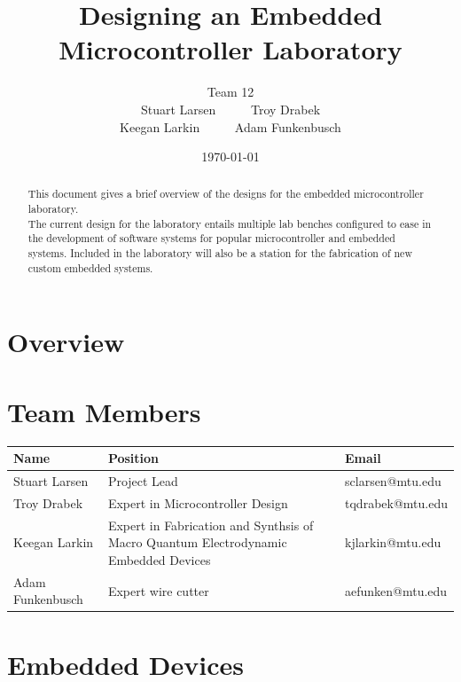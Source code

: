 \documentclass[12pt]{article}
\title{Designing an Embedded Microcontroller Laboratory}
\author{Team 12 \\ Stuart Larsen \ \ \ \ \   Troy Drabek \\ Keegan Larkin \ \ \ \ \   Adam Funkenbusch }
\date{\today}
\begin{document}
\maketitle
\thispagestyle{empty}

\pagebreak
\begin{abstract}

  This document gives a brief overview of the designs for the embedded microcontroller laboratory. \\

  \noindent
  The current design for the laboratory entails multiple lab benches configured to ease in the development of software systems for popular microcontroller and embedded systems. Included in the laboratory will also be a station for the fabrication of new custom embedded systems.

\end{abstract}

\thispagestyle{empty}
\pagebreak

\tableofcontents
\thispagestyle{empty}
\pagebreak
\setcounter{page}{1}


\section{Overview}

\section{Team Members}
\begin{center}
  \begin{tabular}{  l | p{8cm} | l }
    Name & Position & Email \\
    \hline
    Stuart Larsen & Project Lead & sclarsen@mtu.edu \\ 
    Troy Drabek & Expert in Microcontroller Design & tqdrabek@mtu.edu \\
    Keegan Larkin & Expert in Fabrication and Synthsis of Macro Quantum Electrodynamic Embedded Devices  & kjlarkin@mtu.edu \\
    Adam Funkenbusch & Expert wire cutter & aefunken@mtu.edu \\

  \end{tabular}
\end{center}

\section{Embedded Devices}
\end{document}
